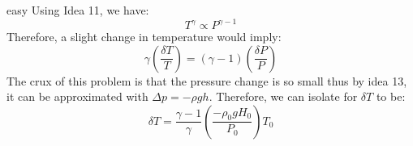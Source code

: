 \begin{solution}{easy}
Using Idea 11, we have:
$$T^\gamma \propto P^{\gamma-1}$$
Therefore, a slight change in temperature would imply:
$$\gamma\left(\frac{\delta T}{T}\right) = (\gamma-1)\left(\frac{\delta P}{P}\right)$$
The crux of this problem is that the pressure change is so small thus by idea 13, it can be approximated with $\Delta p=-\rho gh$. Therefore, we can isolate for $\delta T$ to be:
$$\delta T =\frac{\gamma-1}{\gamma}\left(\frac{-\rho_0 gH_0}{P_0}\right)T_0$$
\end{solution}